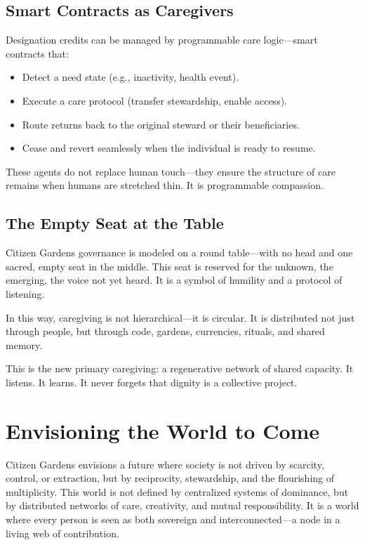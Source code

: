 \documentclass[12pt]{article}
\begin{document}
\subsection*{Smart Contracts as Caregivers}

Designation credits can be managed by programmable care logic—smart contracts that:
\begin{itemize}
    \item Detect a need state (e.g., inactivity, health event).
    \item Execute a care protocol (transfer stewardship, enable access).
    \item Route returns back to the original steward or their beneficiaries.
    \item Cease and revert seamlessly when the individual is ready to resume.
\end{itemize}

These agents do not replace human touch—they ensure the structure of care remains when humans are stretched thin. It is programmable compassion.

\subsection*{The Empty Seat at the Table}

Citizen Gardens governance is modeled on a round table—with no head and one sacred, empty seat in the middle. This seat is reserved for the unknown, the emerging, the voice not yet heard. It is a symbol of humility and a protocol of listening.

In this way, caregiving is not hierarchical—it is circular. It is distributed not just through people, but through code, gardens, currencies, rituals, and shared memory.

This is the new primary caregiving: a regenerative network of shared capacity. It listens. It learns. It never forgets that dignity is a collective project.

\section{Envisioning the World to Come}

Citizen Gardens envisions a future where society is not driven by scarcity, control, or extraction, but by reciprocity, stewardship, and the flourishing of multiplicity. This world is not defined by centralized systems of dominance, but by distributed networks of care, creativity, and mutual responsibility. It is a world where every person is seen as both sovereign and interconnected—a node in a living web of contribution.
\end{document}
